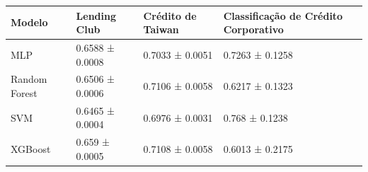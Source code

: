 \begin{tabular}{llll}
\toprule
Modelo & Lending Club & Crédito de Taiwan & Classificação de Crédito Corporativo \\
\midrule
MLP & 0.6588 ± 0.0008 & 0.7033 ± 0.0051 & 0.7263 ± 0.1258 \\
Random Forest & 0.6506 ± 0.0006 & 0.7106 ± 0.0058 & 0.6217 ± 0.1323 \\
SVM & 0.6465 ± 0.0004 & 0.6976 ± 0.0031 & 0.768 ± 0.1238 \\
XGBoost & 0.659 ± 0.0005 & 0.7108 ± 0.0058 & 0.6013 ± 0.2175 \\
\bottomrule
\end{tabular}
